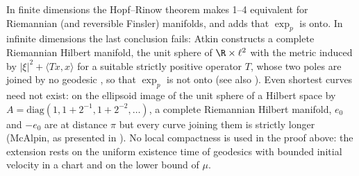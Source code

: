 \begin{remark}
  In finite dimensions the Hopf--Rinow theorem makes 1--4 equivalent for Riemannian (and
  reversible Finsler) manifolds, and adds that $\exp_p$ is onto. In infinite dimensions the last
  conclusion fails: Atkin constructs a complete Riemannian Hilbert manifold, the unit sphere of
  $\R \times \ell^2$ with the metric induced by $|\xi|^2 + \langle Tx, x\rangle$ for a suitable
  strictly positive operator $T$, whose two poles are joined by no geodesic
  \cite[(3), p.~262, and Lemma~6, p.~265]{Atk75}, so that $\exp_p$ is not onto (see also
  \cite[p.~288]{Eke78}). Even shortest curves
  need not exist: on the ellipsoid image of the unit sphere of a Hilbert space by
  $A = \mathrm{diag}(1, 1 + 2^{-1}, 1 + 2^{-2}, \dots)$, a complete Riemannian Hilbert manifold,
  $e_0$ and $-e_0$ are at distance $\pi$ but every curve joining them is strictly longer
  (McAlpin, as presented in \cite[Ejemplo~10.4.2, pp.~301--302]{Lar26}). No local compactness is
  used in the proof above: the extension rests on the uniform existence time of geodesics with
  bounded initial velocity in a chart and on the lower bound of $\mu$.
\end{remark}
